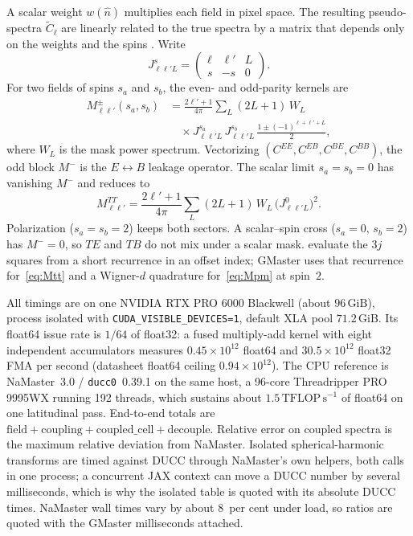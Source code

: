 \documentclass[usenatbib,useAMS]{mnras}
\begin{document}
A scalar weight $w(\hat n)$ multiplies each field in pixel space. The resulting pseudo-spectra $\tilde C_\ell$ are linearly related to the true spectra by a matrix that depends only on the weights and the spins \citep{hivon2002,alonso2019}. Write
\begin{equation}
  J^{s}_{\ell\ell'L}
  =\begin{pmatrix}\ell&\ell'&L\\ s&-s&0\end{pmatrix}.
  \label{eq:Js}
\end{equation}
For two fields of spins $s_a$ and $s_b$, the even- and odd-parity kernels are
\begin{equation}
\begin{split}
  M^\pm_{\ell\ell'}(s_a,s_b)
  &=\frac{2\ell'+1}{4\pi}\sum_L(2L+1)\,W_L\\
  &\quad\times J^{s_a}_{\ell\ell'L}\,
  J^{s_b}_{\ell\ell'L}\,
  \frac{1\pm(-1)^{\ell+\ell'+L}}{2},
\end{split}
\label{eq:Mpm}
\end{equation}
where $W_L$ is the mask power spectrum. Vectorizing $(C^{EE},C^{EB},C^{BE},C^{BB})$, the odd block $M^-$ is the $E\leftrightarrow B$ leakage operator. The scalar limit $s_a=s_b=0$ has vanishing $M^-$ and reduces to
\begin{equation}
  M^{TT}_{\ell\ell'}
  =\frac{2\ell'+1}{4\pi}
  \sum_L(2L+1)\,W_L\,
  \bigl(J^{0}_{\ell\ell'L}\bigr)^2.
  \label{eq:Mtt}
\end{equation}
Polarization ($s_a=s_b=2$) keeps both sectors. A scalar--spin cross ($s_a=0$, $s_b=2$) has $M^-=0$, so $TE$ and $TB$ do not mix under a scalar mask. \citet{kiddier2026} evaluate the $3j$ squares from a short recurrence in an offset index; GMaster uses that recurrence for~\eqref{eq:Mtt} and a Wigner-$d$ quadrature for~\eqref{eq:Mpm} at spin~$2$.

All timings are on one NVIDIA RTX PRO 6000 Blackwell (about $96\,\mathrm{GiB}$), process isolated with \texttt{CUDA\_VISIBLE\_DEVICES=1}, default XLA pool $71.2\,\mathrm{GiB}$. Its float64 issue rate is $1/64$ of float32: a fused multiply-add kernel with eight independent accumulators measures $0.45\times10^{12}$ float64 and $30.5\times10^{12}$ float32 FMA per second (datasheet float64 ceiling $0.94\times10^{12}$). The CPU reference is NaMaster~3.0 / \texttt{ducc0}~0.39.1 on the same host, a 96-core Threadripper PRO 9995WX running 192 threads, which sustains about $1.5\,\mathrm{TFLOP\,s^{-1}}$ of float64 on one latitudinal pass. End-to-end totals are $\mathrm{field}+\mathrm{coupling}+\mathrm{coupled\_cell}+\mathrm{decouple}$. Relative error on coupled spectra is the maximum relative deviation from NaMaster. Isolated spherical-harmonic transforms are timed against DUCC through NaMaster's own helpers, both calls in one process; a concurrent JAX context can move a DUCC number by several milliseconds, which is why the isolated table is quoted with its absolute DUCC times. NaMaster wall times vary by about $8$~per cent under load, so ratios are quoted with the GMaster milliseconds attached.
\end{document}
